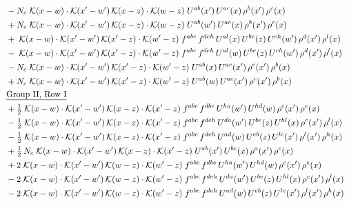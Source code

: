 \documentclass[10pt]{article}
\numberwithin{equation}{section}
\begin{document}
\begin{align}
&\quad -N_c\;\mathcal{K}(x-w)\cdot\mathcal{K}(x'-w')\,\mathcal{K}(x-z)\cdot\mathcal{K}(w-z)\;U^{ab}(x')\,U^{ac}(x)\,\rho^{b}(x')\,\rho^{c}(x)\notag\\
&\quad +N_c\;\mathcal{K}(x-w)\cdot\mathcal{K}(x'-w')\,\mathcal{K}(x-z)\cdot\mathcal{K}(w-z)\;U^{ab}(w')\,U^{ac}(x)\,\rho^{b}(x')\,\rho^{c}(x)\notag\\
&\quad +\;\mathcal{K}(x-w)\cdot\mathcal{K}(x'-w')\,\mathcal{K}(x'-z)\cdot\mathcal{K}(w'-z)\;f^{abc}\,f^{deh}\,U^{al}(x)\,U^{be}(z)\,U^{ch}(w')\,\rho^{d}(x')\,\rho^{l}(x)\notag\\
&\quad -\;\mathcal{K}(x-w)\cdot\mathcal{K}(x'-w')\,\mathcal{K}(x'-z)\cdot\mathcal{K}(w'-z)\;f^{abc}\,f^{deh}\,U^{al}(w)\,U^{be}(z)\,U^{ch}(w')\,\rho^{d}(x')\,\rho^{l}(x)\notag\\
&\quad -N_c\;\mathcal{K}(x-w)\cdot\mathcal{K}(x'-w')\,\mathcal{K}(x'-z)\cdot\mathcal{K}(w'-z)\;U^{ab}(x)\,U^{ac}(x')\,\rho^{c}(x')\,\rho^{b}(x)\notag\\
&\quad +N_c\;\mathcal{K}(x-w)\cdot\mathcal{K}(x'-w')\,\mathcal{K}(x'-z)\cdot\mathcal{K}(w'-z)\;U^{ab}(w)\,U^{ac}(x')\,\rho^{c}(x')\,\rho^{b}(x)\notag\\
&\quad\underline{\text{Group II, Row I}}\notag\\
&\quad +\tfrac{1}{2}\;\mathcal{K}(x-w)\cdot\mathcal{K}(x'-w')\,\mathcal{K}(x-z)\cdot\mathcal{K}(x'-z)\;f^{abc}\,f^{dbe}\,U^{ha}(w')\,U^{hd}(w)\,\rho^{c}(x')\,\rho^{e}(x)\notag\\
&\quad -\tfrac{1}{2}\;\mathcal{K}(x-w)\cdot\mathcal{K}(x'-w')\,\mathcal{K}(x-z)\cdot\mathcal{K}(x'-z)\;f^{abc}\,f^{deh}\,U^{da}(w')\,U^{be}(z)\,U^{hl}(x)\,\rho^{c}(x')\,\rho^{l}(x)\notag\\
&\quad -\tfrac{1}{2}\;\mathcal{K}(x-w)\cdot\mathcal{K}(x'-w')\,\mathcal{K}(x-z)\cdot\mathcal{K}(x'-z)\;f^{abc}\,f^{deh}\,U^{ad}(w)\,U^{eb}(z)\,U^{lc}(x')\,\rho^{l}(x')\,\rho^{h}(x)\notag\\
&\quad +\tfrac{1}{2}\,N_c\;\mathcal{K}(x-w)\cdot\mathcal{K}(x'-w')\,\mathcal{K}(x-z)\cdot\mathcal{K}(x'-z)\;U^{ab}(x')\,U^{bc}(x)\,\rho^{a}(x')\,\rho^{c}(x)\notag\\
&\quad +2\;\mathcal{K}(x-w)\cdot\mathcal{K}(x'-w')\,\mathcal{K}(w-z)\cdot\mathcal{K}(w'-z)\;f^{abc}\,f^{dbe}\,U^{ha}(w')\,U^{hd}(w)\,\rho^{c}(x')\,\rho^{e}(x)\notag\\
&\quad -2\;\mathcal{K}(x-w)\cdot\mathcal{K}(x'-w')\,\mathcal{K}(w-z)\cdot\mathcal{K}(w'-z)\;f^{abc}\,f^{deh}\,U^{da}(w')\,U^{be}(z)\,U^{hl}(x)\,\rho^{c}(x')\,\rho^{l}(x)\notag\\
&\quad -2\;\mathcal{K}(x-w)\cdot\mathcal{K}(x'-w')\,\mathcal{K}(w-z)\cdot\mathcal{K}(w'-z)\;f^{abc}\,f^{deh}\,U^{ad}(w)\,U^{eb}(z)\,U^{lc}(x')\,\rho^{l}(x')\,\rho^{h}(x)\notag\\

\end{align}
\end{document}

